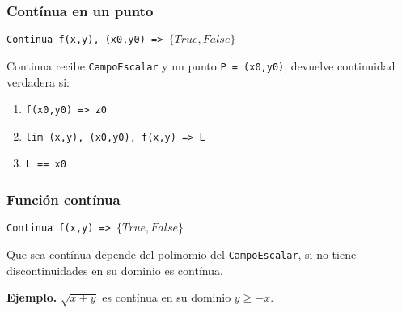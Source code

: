 \subsubsection{Contínua en un punto}

\texttt{Continua f(x,y), (x0,y0) => \(\{True, False\}\)}

Continua recibe \texttt{CampoEscalar} y un punto \texttt{P = (x0,y0)},
devuelve continuidad verdadera si:

\begin{enumerate}
    \item \texttt{f(x0,y0) => z0}
    \item \texttt{lim (x,y), (x0,y0), f(x,y) => L}
    \item \texttt{L == x0}
\end{enumerate}

\subsubsection{Función contínua}

\texttt{Continua f(x,y) => \(\{True, False\}\)}

Que sea contínua depende del polinomio del \texttt{CampoEscalar},
si no tiene discontinuidades en su dominio es contínua.

\textbf{Ejemplo.}
\(\sqrt{x+y}\) es contínua en su dominio \(y \geq -x\).